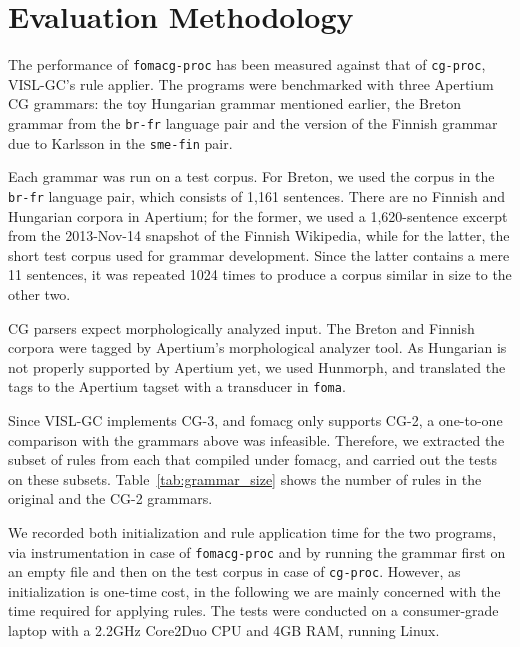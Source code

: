 \documentclass{article}
\begin{document}

\section{Evaluation Methodology}
\label{sec:methodology}
The performance of \texttt{fomacg-proc} has been measured against that of
\texttt{cg-proc}, VISL-GC's rule applier. The programs were benchmarked with
three Apertium CG grammars: the toy Hungarian grammar mentioned earlier, the
Breton grammar from the \texttt{br-fr} language pair and the version of the
Finnish grammar due to Karlsson in the \texttt{sme-fin} pair. %

Each grammar was run on a test corpus. For Breton, we used the corpus
in the \texttt{br-fr} language pair, which consists of 1,161 sentences. There are
no Finnish and Hungarian corpora in Apertium; for the former, we used a
1,620-sentence excerpt from the 2013-Nov-14 snapshot of the Finnish Wikipedia,
while for the latter, the short test corpus used for grammar development. Since
the latter contains a mere 11 sentences, it was repeated 1024 times to produce
a corpus similar in size to the other two.

CG parsers expect morphologically analyzed input. The Breton and Finnish corpora
were tagged by Apertium's morphological analyzer tool. As Hungarian is not
properly supported by Apertium yet, we used Hunmorph\cite{Tron:2005}, and
translated the tags to the Apertium tagset with a transducer in \texttt{foma}.

Since VISL-GC implements CG-3, and fomacg only supports CG-2, a one-to-one
comparison with the grammars above was infeasible. Therefore, we extracted the
subset of rules from each that compiled under fomacg, and carried out the tests
on these subsets. Table~\ref{tab:grammar_size} shows the number of rules in the
original and the CG-2 grammars.

We recorded both initialization and rule application time for the two programs,
via instrumentation in case of \texttt{fomacg-proc} and by running the grammar
first on an empty file and then on the test corpus in case of \texttt{cg-proc}.
However, as initialization is one-time cost, in the following we are mainly
concerned with the time required for applying rules. The tests were conducted on
a consumer-grade laptop with a 2.2GHz Core2Duo CPU and 4GB RAM, running Linux.
\end{document}
